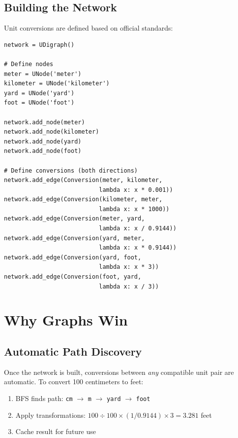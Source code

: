 \documentclass[11pt,a4paper]{report}
\begin{document}
\subsection{Building the Network}

Unit conversions are defined based on official standards:

\begin{lstlisting}[style=pythonstyle, caption={Example network construction}]
network = UDigraph()

# Define nodes
meter = UNode('meter')
kilometer = UNode('kilometer')
yard = UNode('yard')
foot = UNode('foot')

network.add_node(meter)
network.add_node(kilometer)
network.add_node(yard)
network.add_node(foot)

# Define conversions (both directions)
network.add_edge(Conversion(meter, kilometer, 
                           lambda x: x * 0.001))
network.add_edge(Conversion(kilometer, meter, 
                           lambda x: x * 1000))
network.add_edge(Conversion(meter, yard, 
                           lambda x: x / 0.9144))
network.add_edge(Conversion(yard, meter, 
                           lambda x: x * 0.9144))
network.add_edge(Conversion(yard, foot, 
                           lambda x: x * 3))
network.add_edge(Conversion(foot, yard, 
                           lambda x: x / 3))
\end{lstlisting}

\section{Why Graphs Win}

\subsection{Automatic Path Discovery}

Once the network is built, conversions between \emph{any} compatible unit pair are automatic. To convert 100 centimeters to feet:
\begin{enumerate}[leftmargin=*]
  \item BFS finds path: \texttt{cm} $\rightarrow$ \texttt{m} $\rightarrow$ \texttt{yard} $\rightarrow$ \texttt{foot}
  \item Apply transformations: $100 \div 100 \times (1/0.9144) \times 3 = 3.281$ feet
  \item Cache result for future use
\end{enumerate}
\end{document}
